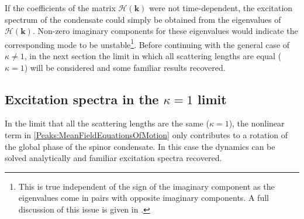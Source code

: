 If the coefficients of the matrix $\mathcal{H}(\bm{k})$ were not time-dependent, the excitation spectrum of the condensate could simply be obtained from the eigenvalues of $\mathcal{H}(\bm{k})$. Non-zero imaginary components for these eigenvalues would indicate the corresponding mode to be unstable\footnote{This is true independent of the sign of the imaginary component as the eigenvalues come in pairs with opposite imaginary components. A full discussion of this issue is given in .}. Before continuing with the general case of $\kappa \neq 1$, in the next section the limit in which all scattering lengths are equal ($\kappa=1$) will be considered and some familiar results recovered.

\subsection{Excitation spectra in the $\kappa = 1$ limit}
\label{Peaks:Kappa1Limit}
In the limit that all the scattering lengths are the same ($\kappa = 1$), the nonlinear term in \eqref{Peaks:MeanFieldEquationsOfMotion} only contributes to a rotation of the global phase of the spinor condensate. In this case the dynamics can be solved analytically and familiar excitation spectra recovered.

